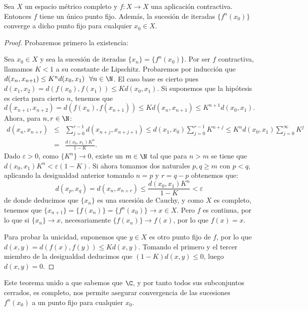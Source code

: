 \begin{teorema}
    Sea $X$ un espacio métrico completo y $f:X\longrightarrow X$ una aplicación contractiva. Entonces $f$ tiene un único punto fijo. Además, la sucesión de iteradas $\{f^n(x_0)\}$ converge a dicho punto fijo para cualquier $x_0\in X$. 
\end{teorema}
\begin{proof}
    Probaremos primero la existencia:

    Sea $x_0\in X$ y sea la sucesión de iteradas $\{x_n\}=\{f^n(x_0)\}$. Por ser $f$ contractiva, llamamos $K<1$ a su constante de Lipschitz. Probaremos por inducción que $d(x_n,x_{n+1})\leq K^n d(x_0,x_1) \ \ \forall n\in\N$.
    El caso base es cierto pues $d(x_1,x_2)=d(f(x_0),f(x_1))\leq K d(x_0,x_1)$. Si suponemos que la hipótesis es cierta para cierto $n$, tenemos que
    $$
    d(x_{n+1},x_{n+2})=d(f(x_n),f(x_{n+1}))\leq K d(x_n,x_{n+1})\leq K^{n+1}d(x_0,x_1).
    $$
    Ahora, para $n,r\in\N$:
    \begin{eqnarray*}
        d(x_n,x_{n+r}) & \leq & \sum_{j=0}^{r-1}d(x_{n+j},x_{n+j+1}) \leq d(x_1,x_0)\sum_{j=0}^{r-1}K^{n+j} \leq K^n d(x_0,x_1)\sum_{j=0}^{\infty} K^j \\
        & = & \frac{d(x_0,x_1)K^n}{1-K}.
    \end{eqnarray*}
    Dado $\varepsilon>0$, como $\{K^n\}\rightarrow 0$, existe un $m\in\N$ tal que para $n>m$ se tiene que $d(x_0,x_1)K^n<\varepsilon(1-K)$. Si ahora tomamos dos naturales $p,q\geq m$ con $p<q$, aplicando la desigualdad anterior tomando $n=p$ y $r=q-p$ obtenemos que:
    $$
    d(x_p,x_q) = d(x_n, x_{n+r}) \leq \frac{d(x_0,x_1)K^n}{1-K} < \varepsilon
    $$
    de donde deducimos que $\{x_n\}$ es una sucesión de Cauchy, y como $X$ es completo, tenemos que $\{x_{n+1}\}=\{f(x_n)\}=\{f^n(x_0)\}\rightarrow x\in X$. Pero $f$ es continua, por lo que si $\{x_n\}\rightarrow x$, necesariamente $\{f(x_n)\}\rightarrow f(x)$, por lo que $f(x)=x$.

    Para probar la unicidad, suponemos que $y\in X$ es otro punto fijo de $f$, por lo que $d(x,y) = d(f(x),f(y))\leq K d(x,y)$. Tomando el primero y el tercer miembro de la desigualdad deducimos que $(1-K)d(x,y)\leq 0$, luego $d(x,y)=0$.
\end{proof}

Este teorema unido a que sabemos que $\C$, y por tanto todos sus subconjuntos cerrados, es completo, nos permite asegurar convergencia de las sucesiones $f^n(x_0)$ a un punto fijo para cualquier $x_0$.




